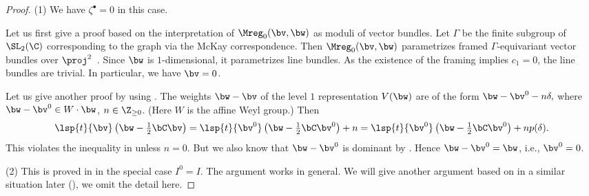 \begin{proof}
(1) We have $\zeta^\bullet = 0$ in this case.

Let us f\/irst give a proof based on the interpretation of
$\Mreg_0(\bv,\bw)$ as moduli of vector bundles.
%
Let $\Gamma$ be the f\/inite subgroup of $\SL_2(\C)$ corresponding to
the graph via the McKay correspondence.
%
Then $\Mreg_0(\bv,\bw)$ parametrizes framed $\Gamma$-equivariant
vector bundles over $\proj^2$~\cite{Lecture}. Since $\bw$ is
$1$-dimensional, it parametrizes line bundles. As the existence of the
framing implies $c_1 = 0$, the line bundles are trivial. In
particular, we have $\bv = 0$.

Let us give another proof by using . The weights $\bw -
\bv$ of the level $1$ representation $V(\bw)$ are of the form
\(
  \bw - \bv^0 - n\delta,
\)
where $\bw - \bv^0\in W\cdot \bw$, $n\in\Z_{\ge 0}$.
(Here $W$ is the af\/f\/ine Weyl group.)
Then
\[
   \lsp{t}{\bv}\left(\bw - \tfrac12 \bC \bv\right)
   = \lsp{t}{\bv^0}\left(\bw - \tfrac12 \bC \bv^0\right) + n
   = \lsp{t}{\bv^0}\left(\bw - \tfrac12 \bC \bv^0\right) + n p(\delta).
\]
This violates the inequality in  unless $n=0$. But we
also know that $\bw - \bv^0$ is dominant by .
Hence $\bw - \bv^0 = \bw$, i.e., $\bv^0 = 0$.

(2) This is proved in \cite[10.5, 10.8]{Na-alg} in the special case
$I^0 = I$. The argument works in general. We will give another
argument based on  in a similar situation later
(), we omit the detail here.
\end{proof}


